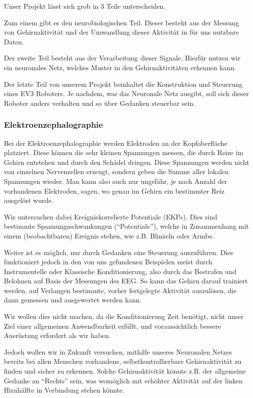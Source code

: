 \documentclass{scrartcl}
\begin{document}
	Unser Projekt lässt sich grob in 3 Teile unterscheiden. 

	Zum einem gibt es den neurobiologischen Teil. Dieser besteht aus der Messung von Gehirnaktivität und der Umwandlung dieser Aktivität in für uns nutzbare Daten. 

	Der zweite Teil besteht aus der Verarbeitung dieser Signale. Hierfür nutzen wir ein neuronales Netz, welches Muster in den Gehirnaktivitäten erkennen kann. 

	Der letzte Teil von unserem Projekt beinhaltet die Konstruktion und Steuerung eines EV3 Roboters. Je nachdem, was das Neuronale Netz ausgibt, soll sich dieser Roboter anders verhalten und so über Gedanken steuerbar sein. 


	\subsubsection{Elektroenzephalographie}

	Bei der Elektroenzephalographie werden Elektroden an der Kopfoberfläche platziert. Diese können die sehr kleinen Spannungen messen, die durch Reize im Gehirn entstehen und durch den Schädel dringen. Diese Spannungen werden nicht von einzelnen Nervenzellen erzeugt, sondern geben die Summe aller lokalen Spannungen wieder. Man kann also auch nur ungefähr, je nach Anzahl der vorhandenen Elektroden, sagen, wo genau im Gehirn ein bestimmter Reiz ausgelöst wurde. 

	Wir untersuchen dabei Ereigniskorrelierte Potentiale (EKPs). Dies sind bestimmte Spannungsschwankungen (\enquote{Potentiale}), welche in Zusammenhang mit einem (beobachtbaren) Ereignis stehen, wie z.B. Blinzeln oder Armbe. 
	
	Weiter ist es möglich, nur durch Gedanken eine Steuerung auszuführen. Dies funktioniert jedoch in den von uns gefundenen Beispielen meist durch Instrumentelle oder Klassische Konditionierung, also durch das Bestrafen und Belohnen auf Basis der Messungen des EEG. So kann das Gehirn darauf trainiert werden, auf Verlangen bestimmte, vorher festgelegte Aktivität auszulösen, die dann gemessen und ausgewertet werden kann. 
	
	Wir wollen dies nicht machen, da die Konditionierung Zeit benötigt, nicht unser Ziel einer allgemeinen Anwendbarkeit erfüllt, und voraussichtlich bessere Ausrüstung erfordert als wir haben. 
	
	Jedoch wollen wir in Zukunft versuchen, mithilfe unseres Neuronalen Netzes bereits bei allen Menschen vorhandene, selbstkontrollierbare Gehirnaktivität zu finden und sicher zu erkennen. Solche Gehirnaktivität könnte z.B. der allgemeine Gedanke an \enquote{Rechts} sein, was womöglich mit erhöhter Aktivität auf der linken Hirnhälfte in Verbindung stehen könnte. 
	
\end{document}
